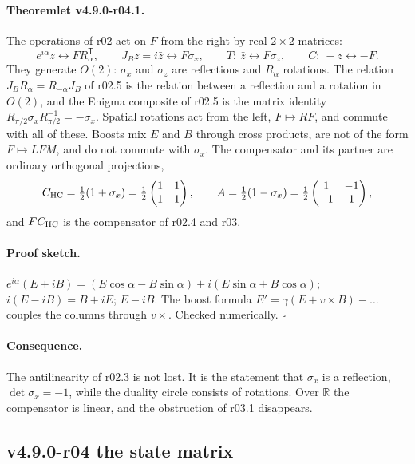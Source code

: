 \paragraph{Theoremlet v4.9.0-r04.1.}
The operations of r02 act on \(F\) from the right by real \(2\times2\) matrices:
\[
e^{i\alpha}z\leftrightarrow FR_\alpha^{\mathsf T},\qquad
J_Bz=i\bar z\leftrightarrow F\sigma_x,\qquad
T:\ \bar z\leftrightarrow F\sigma_z,\qquad
C:\ -z\leftrightarrow -F .
\]
They generate \(O(2)\): \(\sigma_x\) and \(\sigma_z\) are reflections and \(R_\alpha\) rotations.  The relation
\(J_BR_\alpha=R_{-\alpha}J_B\) of r02.5 is the relation between a reflection and a rotation in \(O(2)\), and the Enigma
composite of r02.5 is the matrix identity \(R_{\pi/2}\sigma_xR_{\pi/2}^{-1}=-\sigma_x\).  Spatial rotations act from the
left, \(F\mapsto RF\), and commute with all of these.  Boosts mix \(E\) and \(B\) through cross products, are not of the
form \(F\mapsto LFM\), and do not commute with \(\sigma_x\).  The compensator and its partner are ordinary orthogonal
projections,
\[
C_{\mathrm{HC}}=\tfrac12(1+\sigma_x)=\tfrac12\begin{pmatrix}1&1\\1&1\end{pmatrix},\qquad
A=\tfrac12(1-\sigma_x)=\tfrac12\begin{pmatrix}1&-1\\-1&1\end{pmatrix},
\]
and \(FC_{\mathrm{HC}}\) is the compensator of r02.4 and r03.

\paragraph{Proof sketch.}
\(e^{i\alpha}(E+iB)=(E\cos\alpha-B\sin\alpha)+i(E\sin\alpha+B\cos\alpha)\); \(i(E-iB)=B+iE\); \(E-iB\).  The boost
formula \(E'=\gamma(E+v\times B)-\dots\) couples the columns through \(v\times\).  Checked numerically.  \(\square\)

\paragraph{Consequence.}
The antilinearity of r02.3 is not lost.  It is the statement that \(\sigma_x\) is a reflection, \(\det\sigma_x=-1\),
while the duality circle consists of rotations.  Over \(\mathbb R\) the compensator is linear, and the obstruction of
r03.1 disappears.

\subsection*{v4.9.0-r04 the state matrix}
\label{subsec:v490-r04-state}

